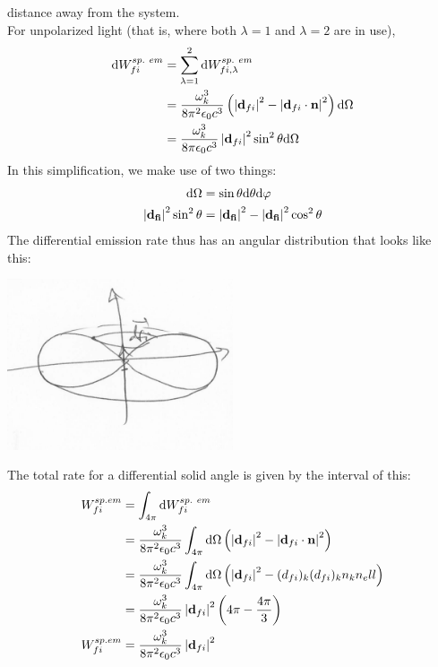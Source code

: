 \documentclass[a4paper]{article}
\begin{document}
distance away from the system.\\
For unpolarized light (that is, where both $\lambda=1$ and $\lambda=2$ are in
use),
\begin{align*}
	\mathrm{d} W_{fi}^{sp.\ em}
		&= \sum_{\lambda=1}^2 \mathrm{d} W_{fi,\lambda}^{sp.\ em}\\
		&= \frac{\omega_k^3}{8\pi^2\epsilon_0 c^3}
		\left(
			\left\lvert \boldsymbol{\mathbf{d}}_{fi}\right\rvert^2 -
			\left\lvert \boldsymbol{\mathbf{d}}_{fi} \cdot \boldsymbol{\mathbf{n}}\right\rvert^2
		\right)\mathrm{d}\Omega\\
		&= \frac{\omega_k^3}{8\pi\epsilon_0 c^3}
		\left\lvert \boldsymbol{\mathbf{d}}_{fi}\right\rvert^2\sin^2\theta\mathrm{d}\Omega
\end{align*}
In this simplification, we make use of two things:
\begin{align*}
	\mathrm{d}\Omega &= \sin\theta\mathrm{d}\theta\mathrm{d}\varphi\\
	\left\lvert \boldsymbol{\mathbf{d_{fi}}}\right\rvert^2\sin^2\theta &= 
		\left\lvert \boldsymbol{\mathbf{d_{fi}}}\right\rvert^2 - \left\lvert \boldsymbol{\mathbf{d_{fi}}}\right\rvert^2\cos^2\theta
\end{align*}
The differential emission rate thus has an angular distribution that looks like
this:
\begin{center}
	\includegraphics[width=0.5\textwidth]{DiffEm.png}
\end{center}
The total rate for a differential solid angle is given by the interval of this:
\begin{align*}
	W_{fi}^{sp. em} &= \int_{4\pi} \mathrm{d} W_{fi}^{sp.\ em}\\
			&= \frac{\omega_k^3}{8\pi^2\epsilon_0 c^3}
			\int_{4\pi} \mathrm{d}\Omega \left(\left\lvert \boldsymbol{\mathbf{d}}_{fi}\right\rvert^2
			-\left\lvert \boldsymbol{\mathbf{d}}_{fi}\cdot\boldsymbol{\mathbf{n}}\right\rvert^2\right)\\
			&= \frac{\omega_k^3}{8\pi^2\epsilon_0 c^3}
			\int_{4\pi} \mathrm{d}\Omega \left(\left\lvert \boldsymbol{\mathbf{d}}_{fi}\right\rvert^2
			-(d_{fi})_k(d_{fi})_k n_k n_ell\right)\\
			&= \frac{\omega_k^3}{8\pi^2\epsilon_0 c^3}
			\left\lvert \boldsymbol{\mathbf{d}}_{fi}\right\rvert^2 \left(4\pi - \frac{4\pi}{3}
			\right)\\
	 W_{fi}^{sp. em} &= \frac{\omega_k^3}{8\pi^2\epsilon_0 c^3}
			\left\lvert \boldsymbol{\mathbf{d}}_{fi}\right\rvert^2
\end{align*}
\end{document}
